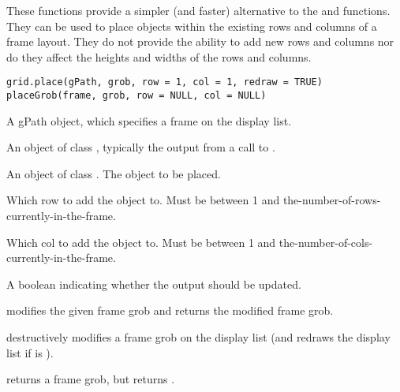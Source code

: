 %
\begin{Description}\relax
These functions provide a simpler (and faster) alternative
to the  and 
functions.  They can be used to place objects within the existing
rows and columns of a frame layout.  They do not provide the ability to
add new rows and columns nor do they affect the
heights and widths of the rows and columns.
\end{Description}
%
\begin{Usage}
\begin{verbatim}
grid.place(gPath, grob, row = 1, col = 1, redraw = TRUE)
placeGrob(frame, grob, row = NULL, col = NULL)
\end{verbatim}
\end{Usage}
%
\begin{Arguments}
\begin{ldescription}
\item[\code{gPath}]  A gPath object, which specifies a frame on the
display list.
\item[\code{frame}]  An object of class , typically the output
from a call to . 
\item[\code{grob}]  An object of class .  The object to be
placed. 
\item[\code{row}]  Which row to add the object to.  Must be between 1 and
the-number-of-rows-currently-in-the-frame. 
\item[\code{col}]  Which col to add the object to.  Must be between 1 and
the-number-of-cols-currently-in-the-frame.  
\item[\code{redraw}]  A boolean indicating whether the output should be updated. 
\end{ldescription}
\end{Arguments}
%
\begin{Details}\relax
{} modifies the given frame grob and returns the modified
frame grob.

 destructively modifies a frame grob on the display
list (and redraws the display list if  is ).

\end{Details}
%
\begin{Value}
 returns a frame grob, but  returns
.
\end{Value}
